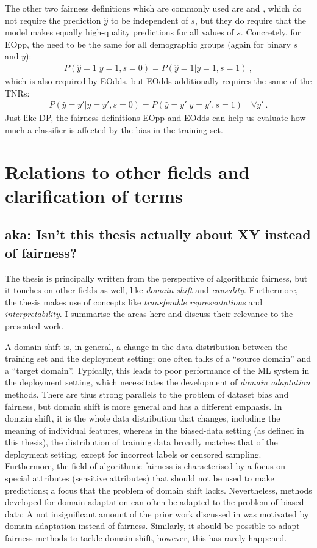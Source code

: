 The other two fairness definitions which are commonly used are  and ,
which do not require the prediction $\hat{y}$ to be independent of $s$,
but they do require that the model makes equally high-quality predictions for all values of $s$.
Concretely, for \ac{EOpp}, the  need to be the same for all demographic groups
(again for binary $s$ and $y$):
\begin{align}
  \label{eq:eopp-def}
  P(\hat{y}=1|y=1,s=0) = P(\hat{y}=1|y=1,s=1)~,
\end{align}
which is also required by \ac{EOdds}, but \ac{EOdds} additionally requires the same of the \acp{TNR}:
\begin{align}
  P(\hat{y}=y'|y=y',s=0) = P(\hat{y}=y'|y=y',s=1)\quad\forall y'~.
  \label{eq:eodds-def}
\end{align}
Just like \ac{DP},
the fairness definitions \ac{EOpp} and \ac{EOdds} can help us evaluate
how much a classifier is affected by the bias in the training set.

\section{Relations to other fields and clarification of terms}
\subsection{aka: Isn't this thesis actually about XY instead of fairness?}
The thesis is principally written from the perspective of algorithmic fairness,
but it touches on other fields as well, like \emph{domain shift} and \emph{causality}.
Furthermore, the thesis makes use of concepts like \emph{transferable representations}
and \emph{interpretability}.
I summarise the areas here and discuss their relevance to the presented work.

A domain shift is, in general, a change in the data distribution between the training set and the deployment setting;
one often talks of a ``source domain'' and a ``target domain''.
Typically, this leads to poor performance of the \ac{ML} system in the deployment setting,
which necessitates the development of \emph{domain adaptation} methods.
There are thus strong parallels to the problem of dataset bias and fairness,
but domain shift is more general and has a different emphasis.
In domain shift, it is the whole data distribution that changes, including the meaning of individual features,
whereas in the biased-data setting (as defined in this thesis), the distribution of training data broadly matches that of the deployment setting, except for incorrect labels or censored sampling.
Furthermore, the field of algorithmic fairness is characterised by a focus on special attributes (sensitive attributes) that should not be used to make predictions;
a focus that the problem of domain shift lacks.
Nevertheless, methods developed for domain adaptation can often be adapted to the problem of biased data:
A not insignificant amount of the prior work discussed in  was motivated by domain adaptation instead of fairness.
Similarly, it should be possible to adapt fairness methods to tackle domain shift,
however, this has rarely happened.

